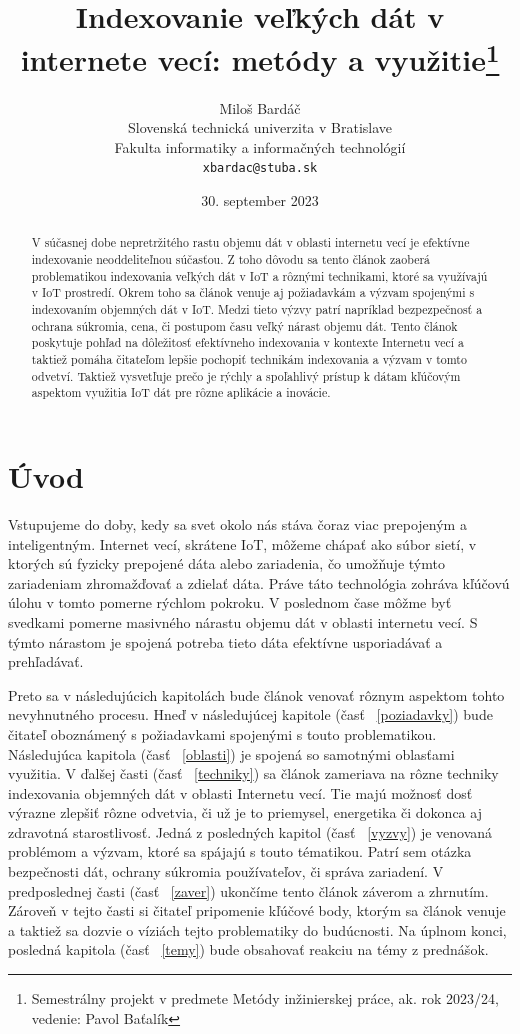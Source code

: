\documentclass[10pt,twoside,slovak,a4paper]{article}
\title{Indexovanie veľkých dát v internete vecí: metódy a využitie\thanks{Semestrálny projekt v predmete Metódy inžinierskej práce, ak. rok 2023/24, vedenie: Pavol Baťalík}}
\author{Miloš Bardáč\\[2pt]
	{\small Slovenská technická univerzita v Bratislave}\\
	{\small Fakulta informatiky a informačných technológií}\\
	{\small \texttt{xbardac@stuba.sk}}
	}
\date{\small 30. september 2023}
\begin{document}
\maketitle

\begin{abstract}

V súčasnej dobe nepretržitého rastu objemu dát v oblasti internetu vecí je efektívne indexovanie neoddeliteľnou súčasťou. Z toho dôvodu sa tento článok zaoberá problematikou indexovania veľkých dát v IoT a rôznými technikami, ktoré sa využívajú v IoT prostredí. Okrem toho sa článok venuje aj požiadavkám a výzvam spojenými s indexovaním objemných dát v IoT. Medzi tieto výzvy patrí napríklad bezpezpečnosť a ochrana súkromia, cena, či postupom času veľký nárast objemu dát. Tento článok poskytuje pohľad na dôležitosť efektívneho indexovania v kontexte Internetu vecí a taktiež pomáha čitateľom lepšie pochopiť technikám indexovania a výzvam v tomto odvetví. Taktiež vysvetľuje prečo je rýchly a spoľahlivý prístup k dátam kľúčovým aspektom využitia IoT dát pre rôzne aplikácie a inovácie.

\end{abstract}


\section{Úvod}

Vstupujeme do doby, kedy sa svet okolo nás stáva čoraz viac prepojeným a inteligentným. Internet vecí, skrátene IoT, môžeme chápať ako súbor sietí, v ktorých sú fyzicky prepojené dáta alebo zariadenia, čo umožňuje týmto zariadeniam zhromažďovať a zdielať dáta. \cite{7916854} Práve táto technológia zohráva kľúčovú úlohu v tomto pomerne rýchlom pokroku. V poslednom čase môžme byť svedkami pomerne masivného nárastu objemu dát v oblasti internetu vecí. S týmto nárastom je spojená potreba tieto dáta efektívne usporiadávať a prehľadávať. 

Preto sa v následujúcich kapitolách bude článok venovať rôznym aspektom tohto nevyhnutného procesu. Hneď v následujúcej kapitole (časť ~\ref{poziadavky}) bude čitateľ oboznámený s požiadavkami spojenými s touto problematikou. Následujúca kapitola (časť ~\ref{oblasti}) je spojená so samotnými oblasťami využitia. V ďalšej časti (časť ~\ref{techniky}) sa článok zameriava na rôzne techniky indexovania objemných dát v oblasti Internetu vecí. Tie majú možnosť dosť výrazne zlepšiť rôzne odvetvia, či už je to priemysel, energetika či dokonca aj zdravotná starostlivosť. Jedná z posledných kapitol (časť ~\ref{vyzvy}) je venovaná problémom a výzvam, ktoré sa spájajú s touto tématikou. Patrí sem otázka bezpečnosti dát, ochrany súkromia používateľov, či správa zariadení. V predposlednej časti (časť ~\ref{zaver}) ukončíme tento článok záverom a zhrnutím. Zároveň v tejto časti si čitateľ pripomenie kľúčové body, ktorým sa článok venuje a taktiež sa dozvie o víziách tejto problematiky do budúcnosti. Na úplnom konci, posledná kapitola (časť ~\ref{temy}) bude obsahovať reakciu na témy z prednášok.
\end{document}
